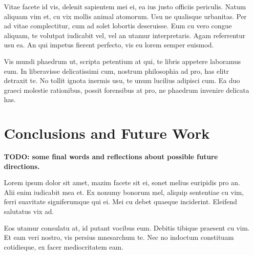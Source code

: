 \documentclass[a4paper,11pt,oneside]{report}
\begin{document}
Vitae facete id vis, delenit sapientem mei ei, ea ius justo officiis
periculis. Natum aliquam vim et, cu vix mollis animal atomorum. Usu ne qualisque
urbanitas. Per ad vitae complectitur, cum ad solet lobortis deseruisse. Eum cu
vero congue aliquam, te volutpat iudicabit vel, vel an utamur
interpretaris. Agam referrentur usu ea. An qui impetus fierent perfecto, vis eu
lorem semper euismod.

Vis mundi phaedrum ut, scripta petentium at qui, te libris appetere laboramus
eum. In liberavisse delicatissimi cum, nostrum philosophia ad pro, has elitr
detraxit te. No tollit ignota inermis usu, te unum lucilius adipisci cum. Ea duo
graeci molestie rationibus, possit forensibus at pro, ne phaedrum invenire
delicata has.


\chapter{Conclusions and Future Work}
\label{chap:conclusions}

\textbf{TODO: some final words and reflections about possible future
  directions.}

Lorem ipsum dolor sit amet, mazim facete sit ei, sonet melius euripidis pro
an. Alii enim iudicabit mea et. Ex nonumy bonorum mel, aliquip sententiae cu
vim, ferri suavitate signiferumque qui ei. Mei cu debet quaeque
inciderint. Eleifend salutatus vix ad.

Eos utamur consulatu at, id putant vocibus eum. Debitis tibique praesent cu
vim. Et eam veri nostro, vis persius mnesarchum te. Nec no indoctum constituam
cotidieque, ex facer mediocritatem eam.

\end{document}
